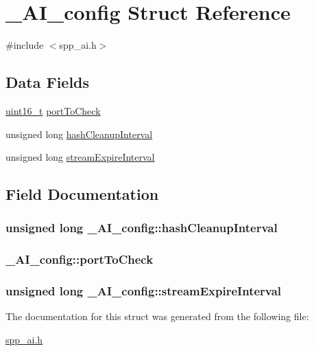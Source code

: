 \hypertarget{struct__AI__config}{
\section{\_\-AI\_\-config Struct Reference}
\label{struct__AI__config}
}


{\ttfamily \#include $<$spp\_\-ai.h$>$}

\subsection*{Data Fields}
\begin{DoxyCompactItemize}
\item 
\hyperlink{spp__ai_8h_a273cf69d639a59973b6019625df33e30}{uint16\_\-t} \hyperlink{struct__AI__config_ab22e082ad6637f6280134e882bf53b0d}{portToCheck}
\item 
unsigned long \hyperlink{struct__AI__config_a890e6756dc637e9d41b7051a4d1ddc93}{hashCleanupInterval}
\item 
unsigned long \hyperlink{struct__AI__config_a338358f23bf15f567a015a99d892c8e7}{streamExpireInterval}
\end{DoxyCompactItemize}


\subsection{Field Documentation}
\hypertarget{struct__AI__config_a890e6756dc637e9d41b7051a4d1ddc93}{
\subsubsection[{hashCleanupInterval}]{\setlength{\rightskip}{0pt plus 5cm}unsigned long {\bf \_\-AI\_\-config::hashCleanupInterval}}}
\label{struct__AI__config_a890e6756dc637e9d41b7051a4d1ddc93}
\hypertarget{struct__AI__config_ab22e082ad6637f6280134e882bf53b0d}{
\subsubsection[{portToCheck}]{ {\bf \_\-AI\_\-config::portToCheck}}}
\label{struct__AI__config_ab22e082ad6637f6280134e882bf53b0d}
\hypertarget{struct__AI__config_a338358f23bf15f567a015a99d892c8e7}{
\subsubsection[{streamExpireInterval}]{\setlength{\rightskip}{0pt plus 5cm}unsigned long {\bf \_\-AI\_\-config::streamExpireInterval}}}
\label{struct__AI__config_a338358f23bf15f567a015a99d892c8e7}


The documentation for this struct was generated from the following file:\begin{DoxyCompactItemize}
\item 
\hyperlink{spp__ai_8h}{spp\_\-ai.h}\end{DoxyCompactItemize}
